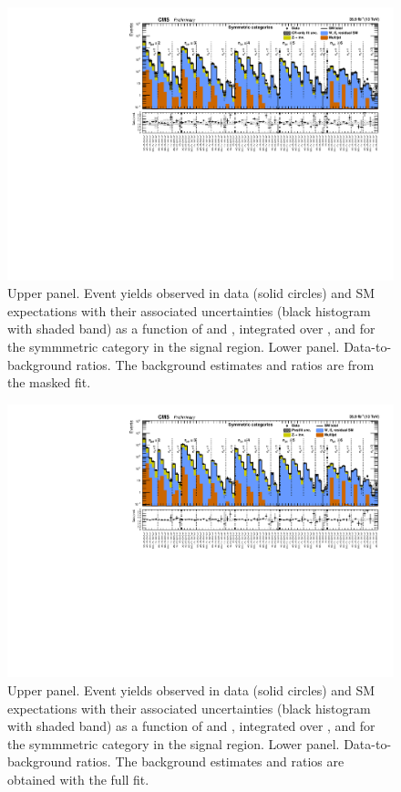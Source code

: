
\clearpage
\begin{figure}[h!]
  \centering
  \caption{Upper panel. Event yields observed in data (solid circles)
    and SM expectations with their associated uncertainties (black
    histogram with shaded band) as a function of \nb and \scalht,
    integrated over \mht, and for the symmmetric \njet category
    in the signal region. Lower panel. Data-to-background ratios. The
    background estimates and ratios are from the masked fit. }
  \label{fig:mr_symm_pre}
  \includegraphics[width=1.\linewidth]{figures/results/36invfb/symm/summaryPlot_Symmetric_prefit}
\end{figure}

\clearpage
\begin{figure}[h!]
  \centering
  \caption{Upper panel. Event yields observed in data (solid circles)
    and SM expectations with their associated uncertainties (black
    histogram with shaded band) as a function of \nb and \scalht,
    integrated over \mht, and for the symmmetric \njet category
    in the signal region. Lower panel. Data-to-background ratios. The
    background estimates and ratios are obtained with the full fit. }
  \label{fig:mr_symm_post}
  \includegraphics[width=1.\linewidth]{figures/results/36invfb/symm/summaryPlot_Symmetric_fit_b}
\end{figure}

